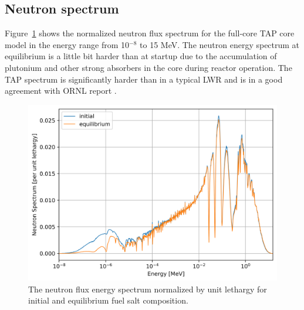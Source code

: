 \documentclass[12pt]{article} %
\begin{document}
\subsection{Neutron spectrum}
Figure~\ref{fig:spectrum} shows the normalized neutron flux spectrum for the 
full-core \gls{TAP} core model in the energy range from 10$^{-8}$ to 15 MeV. 
The neutron energy spectrum at equilibrium is a little bit harder than at 
startup due to the accumulation of plutonium and other strong absorbers in the 
core during reactor operation. The \gls{TAP} spectrum is significantly 
harder than in a typical \gls{LWR} and is in a good agreement with 
\gls{ORNL} report \cite{betzler_assessment_2017}.
\begin{figure}[htp!] %
  \centering
		  \includegraphics[width=\textwidth]{spectrum.png}
	 \vspace{-0.35in}
  \caption{The neutron flux energy spectrum normalized by unit lethargy 
  for initial and equilibrium fuel salt composition.}
  \label{fig:spectrum}
\end{figure}
\end{document}
